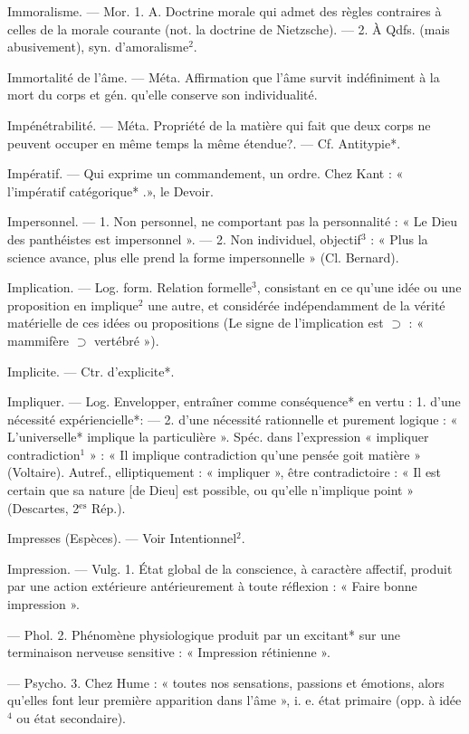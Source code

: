 Immoralisme. — Mor. 1. A. Doctrine
morale qui admet des règles contraires à celles de la morale courante (not. la doctrine de Nietzsche).
— 2. À Qdfs. (mais abusivement),
syn. d'amoralisme$^2$.

Immortalité de l’âme. — Méta. Affirmation que l’âme survit indéfiniment à la mort du corps et gén.
qu'elle conserve son individualité.

Impénétrabilité. — Méta. Propriété
de la matière qui fait que deux corps
ne peuvent occuper en même temps
la même étendue?. — Cf. Antitypie*.

Impératif. — Qui exprime un commandement, un ordre. Chez Kant :
« l'impératif catégorique* .», le
Devoir.

Impersonnel. — 1. Non personnel,
ne comportant pas la personnalité :
« Le Dieu des panthéistes est impersonnel ». — 2. Non individuel,
objectif$^3$ : « Plus la science avance,
plus elle prend la forme impersonnelle » (Cl. Bernard).

Implication. — Log. form. Relation
formelle$^3$, consistant en ce qu’une
idée ou une proposition en implique$^2$
une autre, et considérée indépendamment de la vérité matérielle de
ces idées ou propositions (Le signe de
l’implication est $\supset$ : « mammifère $\supset$
vertébré »).

Implicite. — Ctr. d'explicite*.

Impliquer. — Log. Envelopper, entraîner comme conséquence* en
vertu : 1. d'une nécessité expériencielle*: — 2. d’une nécessité rationnelle et purement logique : « L’universelle* implique la particulière ».
Spéc. dans l'expression « impliquer
contradiction$^1$ » : « Il implique contradiction qu’une pensée goit matière » (Voltaire). Autref., elliptiquement : « impliquer », être contradictoire : « Il est certain que sa
nature [de Dieu] est possible, ou
qu'elle n'implique point » (Descartes, 2$^\text{es}$ Rép.).

Impresses (Espèces). — Voir Intentionnel$^2$.

Impression. — Vulg. 1. État global de
la conscience, à caractère affectif,
produit par une action extérieure
antérieurement à toute réflexion :
« Faire bonne impression ».

— Phol. 2. Phénomène physiologique produit par un excitant* sur
une terminaison nerveuse sensitive :
« Impression rétinienne ».

— Psycho. 3. Chez Hume : « toutes
nos sensations, passions et émotions,
alors qu’elles font leur première
apparition dans l’âme », i. e. état
primaire (opp. à idée$^4$ ou état secondaire).

